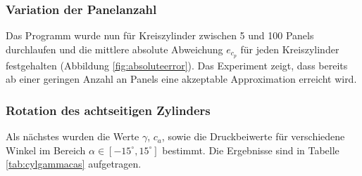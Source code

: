 \subsubsection{Variation der Panelanzahl}
Das Programm wurde nun für Kreiszylinder zwischen 5 und 100 Panels durchlaufen und die mittlere absolute Abweichung $e_{c_p}$ für jeden Kreiszylinder festgehalten (Abbildung \ref{fig:absoluteerror}). Das Experiment zeigt, dass bereits ab einer geringen Anzahl an Panels eine akzeptable Approximation erreicht wird.

\subsubsection{Rotation des achtseitigen Zylinders}
Als nächstes wurden die Werte $\gamma$, $c_a$, sowie die Druckbeiwerte für verschiedene Winkel im Bereich $\alpha \in [-15^{\circ}, 15^{\circ}]$ bestimmt. Die Ergebnisse sind in Tabelle \ref{tab:cylgammacas} aufgetragen. 

